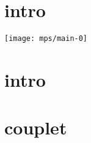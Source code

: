 \documentclass[11pt]{article}
\begin{document}
    \begin{center}
    \end{center}
    \section*{intro}
    \texttt{[image: mps/main-0]}


    \section{intro}
    

    \section{couplet}
    

    \newpage
    




%    


%    
\end{document}
